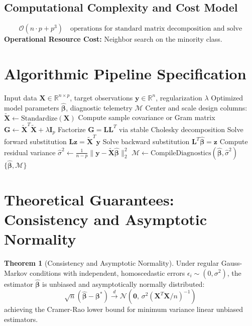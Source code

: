 \documentclass[11pt,a4paper]{article}
\theoremstyle{definition}
\newtheorem{theorem}{\textbf{Theorem}}[section]
\begin{document}
\subsection{Computational Complexity and Cost Model}
\begin{equation}
\mathcal{O}(n \cdot p + p^3) \quad \text{operations for standard matrix decomposition and solve}
\end{equation}
\textbf{Operational Resource Cost:} Neighbor search on the minority class.

\section{Algorithmic Pipeline Specification}

\begin{algorithm}[H]
\caption{SMOTE Execution}
\begin{algorithmic}[1]
\Require Input data $\mathbf{X} \in \mathbb{R}^{n \times p}$, target observations $\mathbf{y} \in \mathbb{R}^n$, regularization $\lambda$
\Ensure Optimized model parameters $\hat{\boldsymbol{\beta}}$, diagnostic telemetry $\mathcal{M}$
\State Center and scale design columns: $\tilde{\mathbf{X}} \gets \text{Standardize}(\mathbf{X})$
\State Compute sample covariance or Gram matrix $\mathbf{G} \gets \tilde{\mathbf{X}}^T \tilde{\mathbf{X}} + \lambda \mathbf{I}_p$
\State Factorize $\mathbf{G} = \mathbf{L} \mathbf{L}^T$ via stable Cholesky decomposition
\State Solve forward substitution $\mathbf{L} \mathbf{z} = \tilde{\mathbf{X}}^T \mathbf{y}$
\State Solve backward substitution $\mathbf{L}^T \hat{\boldsymbol{\beta}} = \mathbf{z}$
\State Compute residual variance $\hat{\sigma}^2 \gets \frac{1}{n - p} \| \mathbf{y} - \tilde{\mathbf{X}} \hat{\boldsymbol{\beta}} \|_2^2$
\State $\mathcal{M} \gets \text{CompileDiagnostics}(\hat{\boldsymbol{\beta}}, \hat{\sigma}^2)$
\State \Return $\{\hat{\boldsymbol{\beta}}, \mathcal{M}\}$
\end{algorithmic}
\end{algorithm}

\section{Theoretical Guarantees: Consistency and Asymptotic Normality}

\begin{theorem}[Consistency and Asymptotic Normality]
Under regular Gauss-Markov conditions with independent, homoscedastic errors $\epsilon_i \sim (0, \sigma^2)$, the estimator $\hat{\boldsymbol{\beta}}$ is unbiased and asymptotically normally distributed:
\begin{equation}
\sqrt{n}(\hat{\boldsymbol{\beta}} - \boldsymbol{\beta}^*) \xrightarrow{d} \mathcal{N}\left(\mathbf{0}, \, \sigma^2 (\mathbf{X}^T \mathbf{X} / n)^{-1}\right)
\end{equation}
achieving the Cramer-Rao lower bound for minimum variance linear unbiased estimators.
\end{theorem}
\end{document}
